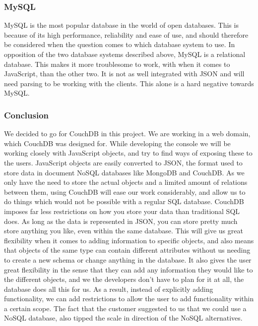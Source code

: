 \subsubsection*{MySQL}
MySQL is the most popular database in the world of open databases. This is because of its high performance, reliability and ease of use, and should therefore be considered when the question comes to which database system to use. In opposition of the two database systems described above, MySQL is a relational database. This makes it more troublesome to work, with when it comes to JavaScript, than the other two. It is not as well integrated with JSON and will need parsing to be working with the clients. This alone is a hard negative towards MySQL.
\cite{mysql-about}


\subsubsection{Conclusion}
We decided to go for CouchDB in this project. We are working in a web domain, which CouchDB was designed for. While developing the console we will be working closely with JavaScript objects, and try to find ways of exposing these to the users. JavaScript objects are easily converted to JSON, the format used to store data in document NoSQL databases like MongoDB and CouchDB.  As we only have the need to store the actual objects and a limited amount of relations between them, using CouchDB will ease our work considerably, and allow us to do things which would not be possible with a regular SQL database. CouchDB imposes far less restrictions on how you store your data than traditional SQL does. As long as the data is represented in JSON, you can store pretty much store anything you like, even within the same database. This will give us great flexibility when it comes to adding information to specific objects, and also means that objects of the same type can contain different attributes without us needing to create a new schema or change anything in the database. It also gives the user great flexibility in the sense that they can add any information they would like to the different objects, and we the developers don't have to plan for it at all, the database does all this for us. As a result, instead of explicitly adding functionality, we can add restrictions to allow the user to add functionality within a certain scope. The fact that the customer suggested to us that we could use a NoSQL database, also tipped the scale in direction of the NoSQL alternatives. 

